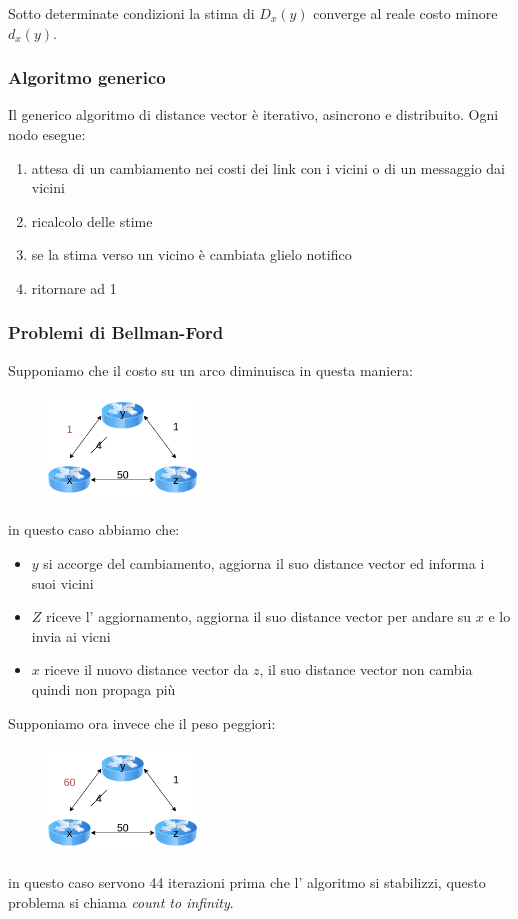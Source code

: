 Sotto determinate condizioni la stima di $D_x(y)$ converge al reale costo minore $d_x(y)$.

\subsubsection{Algoritmo generico}
Il generico algoritmo di distance vector è iterativo, asincrono e distribuito.
Ogni nodo esegue:
\begin{enumerate}
    \item attesa di un cambiamento nei costi dei link con i vicini o di un messaggio dai vicini
    \item ricalcolo delle stime
    \item se la stima verso un vicino è cambiata glielo notifico
    \item ritornare ad 1
\end{enumerate}

\subsubsection{Problemi di Bellman-Ford}
Supponiamo che il costo su un arco diminuisca in questa maniera:
\begin{figure}[H]
    \centering
    \includegraphics[width=150px]{images/5.1_Protocolli_di_routing/bellman_ford_change.png}
\end{figure}
in questo caso abbiamo che:
\begin{itemize}
    \item $y$ si accorge del cambiamento, aggiorna il suo distance vector ed informa i suoi vicini
    \item $Z$ riceve l' aggiornamento, aggiorna il suo distance vector per andare su $x$ e lo invia ai vicni
    \item $x$ riceve il nuovo distance vector da $z$, il suo distance vector non cambia quindi non propaga più
\end{itemize}
Supponiamo ora invece che il peso peggiori:
\begin{figure}[H]
    \centering
    \includegraphics[width=150px]{images/5.1_Protocolli_di_routing/bellman_ford_problem_bad.png}
\end{figure}
in questo caso servono 44 iterazioni prima che l' algoritmo si stabilizzi, questo problema si chiama \emph{count to infinity}.

